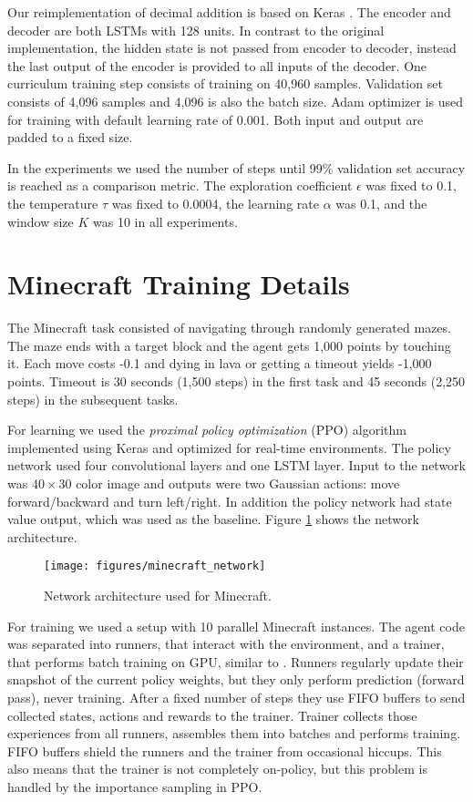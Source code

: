 \begin{appendices}
Our reimplementation of decimal addition is based on Keras \citep{chollet2015keras}. The encoder and decoder are both LSTMs with 128 units. In contrast to the original implementation, the hidden state is not passed from encoder to decoder, instead the last output of the encoder is provided to all inputs of the decoder. One curriculum training step consists of training on 40,960 samples. Validation set consists of 4,096 samples and 4,096 is also the batch size. Adam optimizer \citep{kingma2014adam} is used for training with default learning rate of 0.001. Both input and output are padded to a fixed size.

In the experiments we used the number of steps until 99\% validation set accuracy is reached as a comparison metric. The exploration coefficient $\epsilon$ was fixed to 0.1, the temperature $\tau$ was fixed to 0.0004, the learning rate $\alpha$ was 0.1, and the window size $K$ was 10 in all experiments.
 
\section{Minecraft Training Details}
\label{appendix:minecraft}

The Minecraft task consisted of navigating through randomly generated mazes. The maze ends with a target block and the agent gets 1,000 points by touching it. Each move costs -0.1 and dying in lava or getting a timeout yields -1,000 points. Timeout is 30 seconds (1,500 steps) in the first task and 45 seconds (2,250 steps) in the subsequent tasks.

For learning we used the \textit{proximal policy optimization} (PPO) algorithm \citep{schulman2017proximal} implemented using Keras \citep{chollet2015keras} and optimized for real-time environments. The policy network used four convolutional layers and one LSTM layer. Input to the network was $40\times 30$ color image and outputs were two Gaussian actions: move forward/backward and turn left/right. In addition the policy network had state value output, which was used as the baseline. Figure \ref{f14} shows the network architecture.

\begin{figure}[h]
  \texttt{[image: figures/minecraft\_network]}
\caption{Network architecture used for Minecraft.}
\label{f14}
\end{figure}

For training we used a setup with 10 parallel Minecraft instances. The agent code was separated into runners, that interact with the environment, and a trainer, that performs batch training on GPU, similar to \cite{babaeizadeh2016reinforcement}. Runners regularly update their snapshot of the current policy weights, but they only perform prediction (forward pass), never training. After a fixed number of steps they use FIFO buffers to send collected states, actions and rewards to the trainer. Trainer collects those experiences from all runners, assembles them into batches and performs training. FIFO buffers shield the runners and the trainer from occasional hiccups. This also means that the trainer is not completely on-policy, but this problem is handled by the importance sampling in PPO.


\end{appendices}
